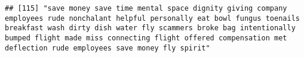 \documentclass[
]{article}
\begin{document}
\begin{verbatim}
## [115] "save money save time mental space dignity giving company employees rude nonchalant helpful personally eat bowl fungus toenails breakfast wash dirty dish water fly scammers broke bag intentionally bumped flight made miss connecting flight offered compensation met deflection rude employees save money fly spirit"                                                                                                                                                                                                                                                                                                                                                                                                                                                                                                                                                                                                                                                                                                                                                                                                                                                                                                                                                                                                                                                                                                                                                                                                                                                                                                                                                                                                                                                                        

\end{verbatim}
\end{document}
